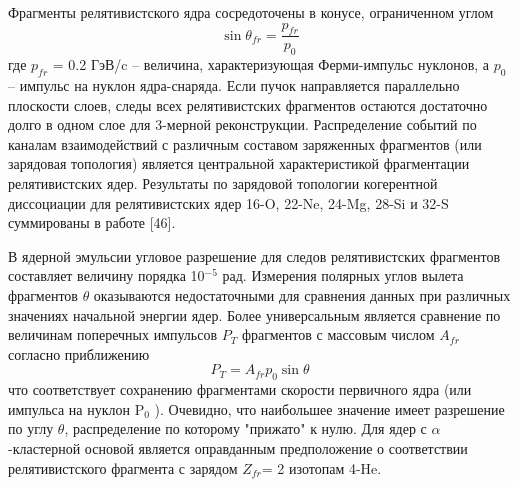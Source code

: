 \documentclass[fontsize=14pt]{scrarticle}
\begin{document}
Фрагменты релятивистского ядра сосредоточены в конусе, ограниченном углом
\begin{equation}
    \sin\theta_{fr}=\frac{p_{fr}}{p_{0}}
    \label{1}
\end{equation}
где $p_{fr}$ = 0.2 ГэВ/c – величина, характеризующая Ферми-импульс нуклонов, а $p_{0}$ – импульс на нуклон ядра-снаряда. Если пучок направляется параллельно плоскости слоев, следы всех релятивистских фрагментов остаются достаточно долго в одном слое для 3-мерной реконструкции. Распределение событий по каналам взаимодействий с различным составом заряженных фрагментов (или зарядовая топология) является центральной характеристикой фрагментации релятивистских ядер. Результаты по зарядовой топологии когерентной диссоциации для релятивистских ядер 16-O, 22-Ne, 24-Mg, 28-Si и 32-S суммированы в работе [46].

В ядерной эмульсии угловое разрешение для следов релятивистских фрагментов составляет величину порядка 10$^{-5}$ рад. Измерения полярных углов вылета фрагментов $\theta$ оказываются недостаточными для сравнения данных при различных значениях начальной энергии ядер. Более универсальным является сравнение по величинам поперечных импульсов $P_{T}$ фрагментов с массовым числом $A_{fr}$ согласно приближению
\begin{equation}
    P_{T}=A_{fr}p_{0}\sin\theta
    \label{2}
\end{equation}
что соответствует сохранению фрагментами скорости первичного ядра (или импульса на нуклон P$_{0}$ ). Очевидно, что наибольшее значение имеет разрешение по углу $\theta$, распределение по которому "прижато" к нулю. Для ядер с $\alpha$-кластерной основой является оправданным предположение о соответствии релятивистского фрагмента с зарядом $Z_{fr}$= 2 изотопам 4-He.
\end{document}
